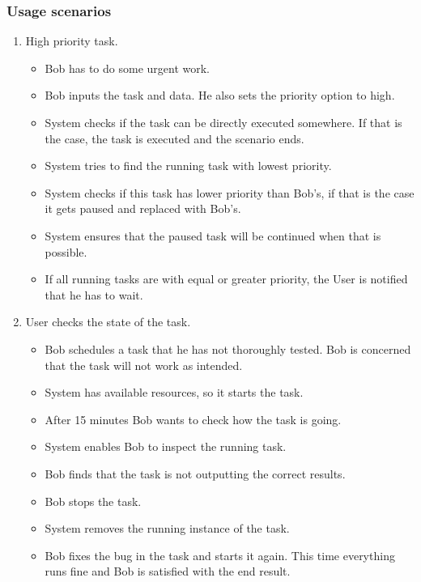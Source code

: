 \subsubsection{Usage scenarios}
\begin{enumerate}
  \item High priority task.
  \begin{itemize}
    \item Bob has to do some urgent work.
    \item Bob inputs the task and data. He also sets the priority option to high.
    \item System checks if the task can be directly executed somewhere.
    If that is the case, the task is executed and the scenario ends.
    \item System tries to find the running task with lowest priority.
    \item System checks if this task has lower priority than Bob's, if that is the case it gets paused and replaced with Bob's.
    \item System ensures that the paused task will be continued when that is possible.
    \item If all running tasks are with equal or greater priority, the User is notified that he has to wait.
  \end{itemize}
  \item User checks the state of the task.
  \begin{itemize}
    \item Bob schedules a task that he has not thoroughly tested.
    Bob is concerned that the task will not work as intended.
    \item System has available resources, so it starts the task.
    \item After 15 minutes Bob wants to check how the task is going.
    \item System enables Bob to inspect the running task.
    \item Bob finds that the task is not outputting the correct results.
    \item Bob stops the task.
    \item System removes the running instance of the task.
    \item Bob fixes the bug in the task and starts it again.
    This time everything runs fine and Bob is satisfied with the end result.
  \end{itemize}
\end{enumerate}
